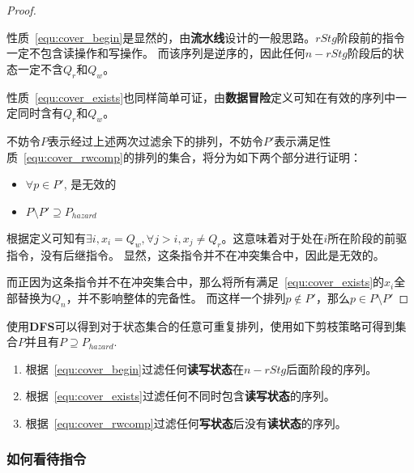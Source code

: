 \documentclass[hyperref,UTF8]{ctexart}
\theoremstyle{definition}
\theoremstyle{remark}
\numberwithin{equation}{subsection}
\newcommand{\Emph}{\textbf}
\begin{document}
	\begin{proof}
	\label{proof:valid_perm_property}
		
		性质~\ref{equ:cover_begin}是显然的，由\Emph{流水线}设计的一般思路。$rStg$阶段前的指令一定不包含读操作和写操作。
		而该序列是逆序的，因此任何$n-rStg$阶段后的状态一定不含$Q_r$和$Q_w$。
		
		性质~\ref{equ:cover_exists}也同样简单可证，由\Emph{数据冒险}定义可知在有效的序列中一定同时含有$Q_r$和$Q_w$。
		
		不妨令$P$表示经过上述两次过滤余下的排列，不妨令$P'$表示满足性质~\ref{equ:cover_rwcomp}的排列的集合，将分为如下两个部分进行证明：
		\begin{itemize}
			\item $\forall p \in P'$, 是无效的
			
			\item $P \setminus P' \supseteq P_{hazard}$
		\end{itemize}
		根据定义可知有$\exists i, x_i = Q_w, \forall j>i, x_j \neq Q_r$。这意味着对于处在$i$所在阶段的前驱指令，没有后继指令。
		显然，这条指令并不在冲突集合中，因此是无效的。
		
		而正因为这条指令并不在冲突集合中，那么将所有满足~\ref{equ:cover_exists}的$x_i$全部替换为$Q_n$，并不影响整体的完备性。
		而这样一个排列$p \notin P'$，那么$p \in P \setminus P'$
		
	\end{proof}
	
	
	使用\Emph{DFS}可以得到对于状态集合的任意可重复排列，使用如下剪枝策略可得到集合$P$并且有$P \supseteq P_{hazard}$.
	\begin{enumerate}
	
		\item 根据~\ref{equ:cover_begin}过滤任何\Emph{读写状态}在$n-rStg$后面阶段的序列。
		
		\item 根据~\ref{equ:cover_exists}过滤任何不同时包含\Emph{读写状态}的序列。
		
		\item 根据~\ref{equ:cover_rwcomp}过滤任何\Emph{写状态}后没有\Emph{读状态}的序列。
		
	\end{enumerate}
	
\subsubsection{如何看待指令}
\end{document}
